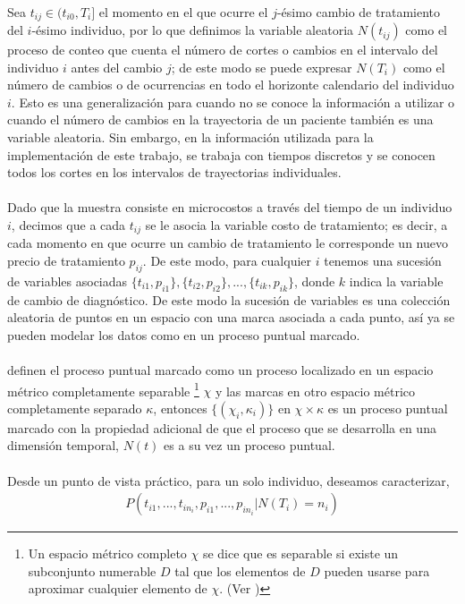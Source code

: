 \\
Sea $t_{ij} \in (t_{i0},T_i]$ el momento en el que ocurre el $j$-\'esimo cambio de tratamiento del $i$-\'esimo individuo, por lo que definimos la variable aleatoria $N(t_{ij})$ como el proceso de conteo que cuenta el n\'umero de cortes o cambios en el intervalo del individuo $i$ antes del cambio $j$; de este modo se puede expresar $N(T_i)$ como el n\'umero de cambios o de ocurrencias en todo el horizonte calendario del individuo $i$. Esto es una generalizaci\'on para cuando no se conoce la informaci\'on a utilizar o cuando el n\'umero de cambios en la trayectoria de un paciente tambi\'en es una variable aleatoria. Sin embargo, en la informaci\'on utilizada para la implementaci\'on de este trabajo, se trabaja con tiempos discretos y se conocen todos los cortes en los intervalos de trayectorias individuales.\\
\\
Dado que la muestra consiste en microcostos a trav\'es del tiempo de un individuo $i$, decimos que a cada $t_{ij}$ se le asocia la variable costo de tratamiento; es decir, a cada momento en que ocurre un cambio de tratamiento le corresponde un nuevo precio de tratamiento $p_{ij}$. De este modo, para cualquier $i$ tenemos una sucesi\'on de variables asociadas $\{t_{i1},p_{i1}\},\{t_{i2},p_{i2}\},...,\{t_{ik},p_{ik}\}$, donde $k$ indica la variable de cambio de diagn\'ostico. De este modo la sucesi\'on de variables es una colecci\'on aleatoria de puntos en un espacio con una marca asociada a cada punto, as\'i ya se pueden modelar los datos como en un proceso puntual marcado.\\
\\
\cite{daley2003} definen el proceso puntual marcado como un proceso localizado en un espacio m\'etrico completamente separable \footnote{Un espacio m\'etrico completo $\chi$ se dice que es separable si existe un subconjunto numerable $D$ tal que los elementos de $D$ pueden usarse para aproximar cualquier elemento de $\chi$. (Ver \cite{schervish2012theory})} $\chi$ y las marcas en otro espacio m\'etrico completamente separado $\kappa$, entonces $\{(\chi_i,\kappa_i)\}$ en $\chi \times \kappa$ es un proceso puntual marcado con la propiedad adicional de que el proceso que se desarrolla en una dimensi\'on temporal, $N(t)$ es a su vez un proceso puntual.\\
\\
Desde un punto de vista pr\'actico, para un solo individuo, deseamos caracterizar,
\begin{align}
P(t_{i1},...,t_{in_i},p_{i1},...,p_{in_i}|N(T_i)=n_i)
\end{align}
